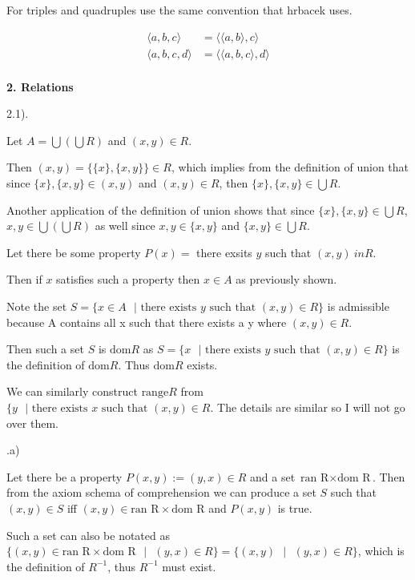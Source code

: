\documentclass{article}
\begin{document}
For triples and quadruples use the same convention that hrbacek uses. 

\begin{align*}
    \langle a,b,c \rangle &= \langle \langle a,b \rangle, c \rangle\\
    \langle a,b,c,d \rangle &= \langle \langle a,b,c \rangle, d \rangle\\
\end{align*}

\medskip
\textbf{2. Relations}
\medskip

2.1).
\medskip

Let $A = \bigcup (\bigcup R)$ and $(x,y) \in R$. 

\medskip

Then $(x,y) = \{\{x\},\{x,y\}\} \in R$, which implies from the definition of union that since $\{x\}, \{x,y\} \in (x,y)$ and $(x,y) \in R$, then $\{x\}, \{x,y\} \in \bigcup R$. 

\medskip
Another application of the definition of union shows that since $\{x\}, \{x,y\} \in \bigcup R$, $x,y \in \bigcup (\bigcup R)$ as well since $x,y \in \{x,y\}$ and $\{x,y\} \in \bigcup R$.

\medskip

Let there be some property $P(x) = $ there exsits $y$ such that $(x,y) \ in R$.

\medskip
Then if $x$ satisfies such a property then $x \in A$ as previously shown.

\medskip
Note the set $S = \{x \in A \text{ } | \text{ there exists } y \text{ such that } (x,y) \in R\}$ is admissible because A contains all x such that there exists a y where $(x,y) \in R$.

\medskip
Then such a set $S$ is $\text{dom} R$ as $S = \{x \text{ } | \text{ there exists } y \text{ such that } (x,y) \in R\}$ is the definition of $\text{dom} R$. Thus $\text{dom} R$ exists.

\medskip
We can similarly construct $\text{range} R$ from $\{y \text{ } | \text{ there exists } x \text{ such that } (x,y) \in R$. The details are similar so I will not go over them.

.a)

\medskip
Let there be a property $P(x,y) := (y,x) \in R$ and a set $\text{ran R} \times \text{dom R}$. Then from the axiom schema of comprehension we can produce a set $S$ such that $(x,y) \in S$ iff $(x,y) \in \text{ran R} \times \text{dom R}$ and $P(x,y)$ is true. 

\medskip
Such a set can also be notated as $\{(x,y) \in \text{ran R} \times \text{dom R} \text{ } | \text{ } (y,x) \in R\} = \{(x,y) \text{ } | \text{ } (y,x) \in R\}$, which is the definition of $R^{-1}$, thus $R^{-1}$ must exist.
\end{document}
